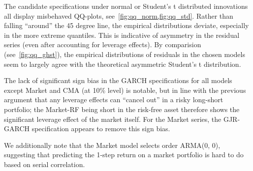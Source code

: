 The candidate specifications under normal or Student's t distributed innovations all display misbehaved QQ-plots, see~\autoref{fig:qq_norm,fig:qq_std}. Rather than falling ``around'' the 45 degree line, the empirical distributions deviate, especially in the more extreme quantiles. This is indicative of asymmetry in the residual series (even after accounting for leverage effects). By comparision (see~\autoref{fig:qq_ghst}), the empirical distributions of residuals in the chosen models seem to largely agree with the theoretical asymmetric Student's t distribution.

The lack of significant sign bias in the GARCH specifications for all models except Market and CMA (at 10\% level) is notable, but in line with the previous argument that any leverage effects can ``cancel out'' in a risky long-short portfolio; the Market-RF being short in the risk-free asset therefore shows the significant leverage effect of the market itself. For the Market series, the GJR-GARCH specification appears to remove this sign bias.

We additionally note that the Market model selects order ARMA(0, 0), suggesting that predicting the 1-step return on a market portfolio is hard to do based on serial correlation.


